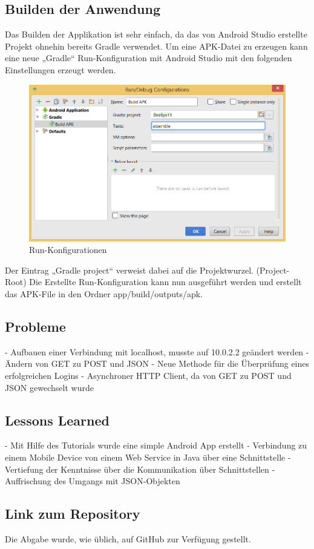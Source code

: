 \subsection{Builden der Anwendung}
\label{subsec:Builden der Anwendung}
Das Builden der Applikation ist sehr einfach, da das von Android Studio erstellte Projekt ohnehin bereits Gradle verwendet. Um eine APK-Datei zu erzeugen kann eine neue „Gradle“ Run-Konfiguration mit Android Studio mit den folgenden Einstellungen erzeugt werden.

\begin{figure}[H]
	\begin{center}
		\includegraphics[width=1.0\linewidth]{images/run.png}
		\caption{Run-Konfigurationen}
		\label{Run-Konfigurationen}
	\end{center}
\end{figure}

Der Eintrag „Gradle project“ verweist dabei auf die Projektwurzel. (Project-Root)
Die Erstellte Run-Konfiguration kann nun ausgeführt werden und erstellt das APK-File in den Ordner app/build/outputs/apk.

\subsection{Probleme}
\label{subsec:Probleme}

- Aufbauen einer Verbindung mit localhost, musste auf 10.0.2.2 geändert werden
- Ändern von GET zu POST und JSON
- Neue Methode für die Überprüfung eines erfolgreichen Logins
- Asynchroner HTTP Client, da von GET zu POST und JSON gewechselt wurde

\subsection{Lessons Learned}
\label{subsec:Lessons Learned}
- Mit Hilfe des Tutorials wurde eine simple Android App erstellt
- Verbindung zu einem Mobile Device von einem Web Service in Java über eine Schnittstelle
- Vertiefung der Kenntnisse über die Kommunikation über Schnittstellen
- Auffrischung des Umgangs mit JSON-Objekten

\subsection{Link zum Repository}
\label{subsec:Link zum Repository}
Die Abgabe wurde, wie üblich, auf GitHub zur Verfügung gestellt. \cite{GitHub-Repo}


\newpage